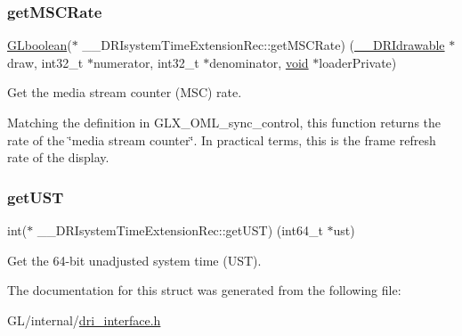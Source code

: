 \mbox{\label{struct_____d_r_isystem_time_extension_rec_a67ced019fa1514882ab8b918185a9af8}} 
\subsubsection{\texorpdfstring{get\+M\+S\+C\+Rate}{getMSCRate}}
{\footnotesize\ttfamily \hyperlink{gl_8h_aea1419aa8aec5854bd9807b45171029d}{G\+Lboolean}($\ast$ \+\_\+\+\_\+\+D\+R\+Isystem\+Time\+Extension\+Rec\+::get\+M\+S\+C\+Rate) (\hyperlink{dri__interface_8h_a5bfb832a0a08208d95b3bbef439d2262}{\+\_\+\+\_\+\+D\+R\+Idrawable} $\ast$draw, int32\+\_\+t $\ast$numerator, int32\+\_\+t $\ast$denominator, \hyperlink{_s_d_l__opengles2__gl2ext_8h_ae5d8fa23ad07c48bb609509eae494c95}{void} $\ast$loader\+Private)}

Get the media stream counter (M\+SC) rate.

Matching the definition in G\+L\+X\+\_\+\+O\+M\+L\+\_\+sync\+\_\+control, this function returns the rate of the \char`\"{}media stream counter\char`\"{}. In practical terms, this is the frame refresh rate of the display. \mbox{\label{struct_____d_r_isystem_time_extension_rec_a18da279203679b19649a8635242d2dbf}} 
\subsubsection{\texorpdfstring{get\+U\+ST}{getUST}}
{\footnotesize\ttfamily int($\ast$ \+\_\+\+\_\+\+D\+R\+Isystem\+Time\+Extension\+Rec\+::get\+U\+ST) (int64\+\_\+t $\ast$ust)}

Get the 64-\/bit unadjusted system time (U\+ST). 

The documentation for this struct was generated from the following file\+:\begin{DoxyCompactItemize}
\item 
G\+L/internal/\hyperlink{dri__interface_8h}{dri\+\_\+interface.\+h}\end{DoxyCompactItemize}
